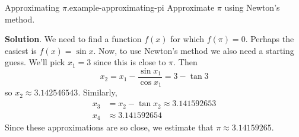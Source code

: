 \documentclass[10pt,]{book}
\numberwithin{equation}{section}
\begin{document}
\begin{example}{Approximating \(\pi\).}{example-approximating-pi}%
\hypertarget{p-371}{}%
Approximate \(\pi\) using Newton's method.%
\par\smallskip%
\noindent\textbf{Solution}.\hypertarget{solution-82}{}\quad%
\hypertarget{p-372}{}%
We need to find a function \(f(x)\) for which \(f(\pi) = 0\). Perhaps the easiest is \(f(x) = \sin x\). Now, to use Newton's method we also need a starting guess. We'll pick \(x_{1} = 3\) since this is close to \(\pi\). Then%
\begin{equation*}
x_{2} = x_{1} - \frac{\sin x_{1}}{\cos x_{1}} = 3 - \tan 3
\end{equation*}
so \(x_{2} \approx 3.142546543\). Similarly,%
\begin{align*}
x_{3} & = x_{2} - \tan x_{2} \approx 3.141592653 \\
x_{4} & \approx 3.141592654 
\end{align*}
Since these approximations are so close, we estimate that \(\pi\approx 3.14159265\).%
\end{example}
\end{document}
